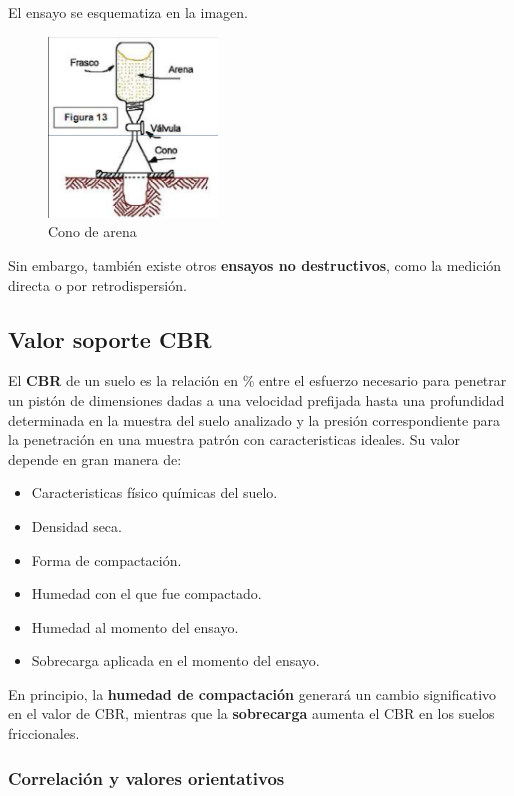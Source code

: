 \documentclass[../main.tex]{subfiles}
\begin{document}
El ensayo se esquematiza en la imagen.

\begin{figure}[ht]
  \centering
  \includegraphics[width=0.4\textwidth]{../images/20210422/cono_arena}
  \caption{Cono de arena}
  \label{fig:cono_arean}
\end{figure}

Sin embargo, también existe otros \textbf{ensayos no destructivos}, como la medición
directa o por retrodispersión.

\subsection{Valor soporte CBR}

El \textbf{CBR} de un suelo es la relación en \% entre el esfuerzo necesario
para penetrar un pistón de dimensiones dadas a una velocidad prefijada hasta una
profundidad determinada en la muestra del suelo analizado y la presión correspondiente
para la penetración en una muestra patrón con caracteristicas ideales. Su valor
depende en gran manera de:

\begin{itemize}
  \item Caracteristicas físico químicas del suelo.
  \item Densidad seca.
  \item  Forma de compactación.
  \item  Humedad con el que fue compactado.
  \item Humedad al momento del ensayo.
  \item Sobrecarga aplicada en el momento del ensayo.
\end{itemize}

En principio, la \textbf{humedad de compactación} generará un cambio significativo
en el valor de CBR, mientras que la \textbf{sobrecarga} aumenta el CBR en los
suelos friccionales.

\subsubsection{Correlación y valores orientativos}
\end{document}
